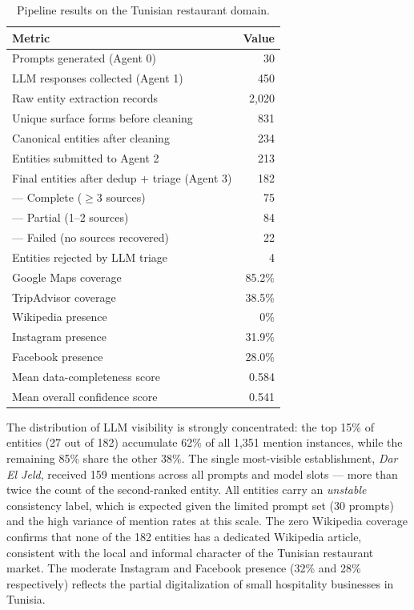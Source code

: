 \begin{table}[H]
\centering
\caption{Pipeline results on the Tunisian restaurant domain.}
\label{tab:pipeline_results}
\begin{tabular}{|p{7cm}|r|}
\hline
\textbf{Metric} & \textbf{Value} \\
\hline
Prompts generated (Agent 0)                          & 30 \\
LLM responses collected (Agent 1)                    & 450 \\
Raw entity extraction records                        & 2{,}020 \\
Unique surface forms before cleaning                 & 831 \\
Canonical entities after cleaning                    & 234 \\
Entities submitted to Agent 2                        & 213 \\
Final entities after dedup + triage (Agent 3)        & 182 \\
\quad — Complete ($\geq$3 sources)                   & 75 \\
\quad — Partial (1--2 sources)                       & 84 \\
\quad — Failed (no sources recovered)                & 22 \\
Entities rejected by LLM triage                      & 4 \\
Google Maps coverage                                 & 85.2\% \\
TripAdvisor coverage                                 & 38.5\% \\
Wikipedia presence                                   & 0\% \\
Instagram presence                                   & 31.9\% \\
Facebook presence                                    & 28.0\% \\
Mean data-completeness score                         & 0.584 \\
Mean overall confidence score                        & 0.541 \\
\hline
\end{tabular}
\end{table}

The distribution of LLM visibility is strongly concentrated: the top 15\% of
entities (27 out of 182) accumulate 62\% of all 1{,}351 mention instances, while
the remaining 85\% share the other 38\%. The single most-visible establishment,
\textit{Dar El Jeld}, received 159 mentions across all prompts and model slots ---
more than twice the count of the second-ranked entity. All entities carry an
\textit{unstable} consistency label, which is expected given the limited prompt set
(30 prompts) and the high variance of mention rates at this scale. The zero
Wikipedia coverage confirms that none of the 182 entities has a dedicated Wikipedia
article, consistent with the local and informal character of the Tunisian restaurant
market. The moderate Instagram and Facebook presence (32\% and 28\% respectively)
reflects the partial digitalization of small hospitality businesses in Tunisia.

